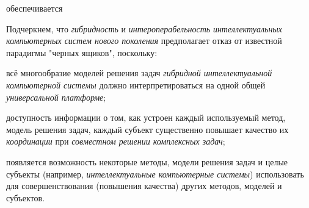 \begin{SCn}


\begin{scnrelfromlistcustom}{обеспечивается}
\end{scnrelfromlistcustom}
\end{SCn}

Подчеркнем, что \textit{гибридность} и \textit{интероперабельность} \textit{интеллектуальных компьютерных систем нового поколения} предполагает отказ от известной парадигмы "черных ящиков"{}, поскольку:

\begin{textitemize}
	\item
	всё многообразие моделей решения задач \textit{гибридной интеллектуальной компьютерной системы} должно интерпретироваться на одной общей \textit{универсальной платформе};
	\item
	доступность информации о том, как устроен каждый используемый метод, модель решения задач, каждый субъект существенно повышает качество их \textit{координации} при \textit{совместном решении комплексных задач};
	\item
	появляется возможность некоторые методы, модели решения задач и целые субъекты (например, \textit{интеллектуальные компьютерные системы}) использовать для совершенствования (повышения качества) других методов, моделей и субъектов.
\end{textitemize}

